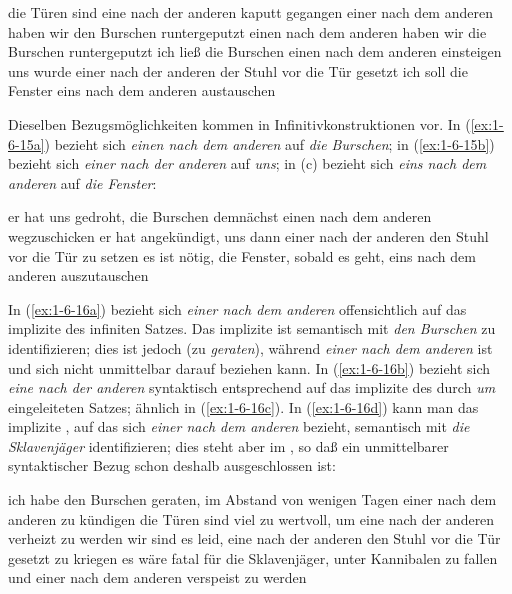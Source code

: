 \documentclass[output=paper]{langsci/langscibook}
\begin{document}
\begin{exe}
\ex\label{ex:1-6-14}
\begin{xlist}
\ex\label{ex:1-6-14a} die Türen sind eine nach der anderen kaputt gegangen
\ex\label{ex:1-6-14b} einer nach dem anderen haben wir den Burschen runtergeputzt
\ex\label{ex:1-6-14c} einen nach dem anderen haben wir die Burschen runtergeputzt
\ex\label{ex:1-6-14d} ich ließ die Burschen einen nach dem anderen einsteigen
\ex\label{ex:1-6-14e} uns wurde einer nach der anderen der Stuhl vor die Tür gesetzt
\ex\label{ex:1-6-14f} ich soll die Fenster eins nach dem anderen austauschen
\end{xlist}
\end{exe}
Dieselben Bezugsmöglichkeiten kommen in Infinitivkonstruktionen vor. In (\ref{ex:1-6-15a}) bezieht sich \textit{einen nach dem anderen} auf \textit{die Burschen}; in (\ref{ex:1-6-15b}) bezieht sich \textit{einer
nach der anderen} auf \textit{uns}; in (c) bezieht sich \textit{eins nach dem anderen} auf \textit{die
Fenster}:
\begin{exe}
\ex\label{ex:1-6-15}
\begin{xlist}
\ex\label{ex:1-6-15a} er hat uns gedroht, die Burschen demnächst einen nach dem anderen wegzuschicken
\ex\label{ex:1-6-15b} er hat angekündigt, uns dann einer nach der anderen den Stuhl vor die Tür zu setzen
\ex\label{ex:1-6-15c} es ist nötig, die Fenster, sobald es geht, eins nach dem anderen auszutauschen
\end{xlist}
\end{exe}
In (\ref{ex:1-6-16a}) bezieht sich \textit{einer nach dem anderen} offensichtlich auf das implizite  des infiniten Satzes. Das implizite  ist semantisch mit \textit{den Burschen} zu
identifizieren; dies ist jedoch  (zu \textit{geraten}), während \textit{einer nach dem
anderen}  ist und sich nicht unmittelbar darauf beziehen kann. In (\ref{ex:1-6-16b}) bezieht sich \textit{eine nach der anderen} syntaktisch entsprechend auf das implizite  des durch \textit{um} eingeleiteten Satzes; ähnlich in (\ref{ex:1-6-16c}). In (\ref{ex:1-6-16d}) kann man das implizite , auf das sich \textit{einer nach dem anderen} bezieht, semantisch mit \textit{die
Sklavenjäger} identifizieren; dies steht aber im , so daß ein unmittelbarer
syntaktischer Bezug schon deshalb ausgeschlossen ist:
\begin{exe}
\ex\label{ex:1-6-16}
\begin{xlist}
\ex\label{ex:1-6-16a}  ich habe den Burschen geraten, im Abstand von wenigen Tagen einer nach dem anderen zu kündigen
\ex\label{ex:1-6-16b} die Türen sind viel zu wertvoll, um eine nach der anderen verheizt zu werden
\ex\label{ex:1-6-16c} wir sind es leid, eine nach der anderen den Stuhl vor die Tür gesetzt zu kriegen
\ex\label{ex:1-6-16d} es wäre fatal für die Sklavenjäger, unter Kannibalen zu fallen und einer nach
dem anderen verspeist zu werden
\end{xlist}
\end{exe}
\end{document}
